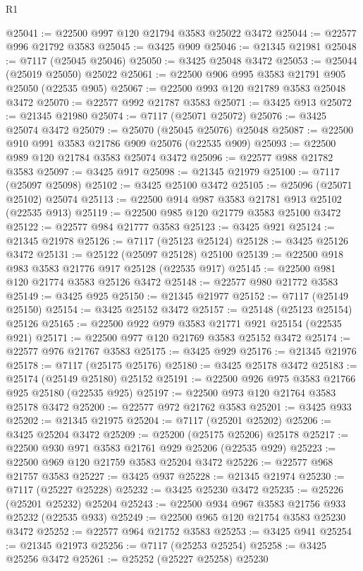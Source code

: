 \begin{lexlean}{R1}
\begin{coremodule}
@25041 := @22500 @997 @120 @21794 @3583 @25022 @3472
@25044 := @22577 @996 @21792 @3583
@25045 := @3425 @909
@25046 := @21345 @21981
@25048 := @7117 (@25045 @25046)
@25050 := @3425 @25048 @3472
@25053 := @25044 (@25019 @25050) @25022
@25061 := @22500 @906 @995 @3583 @21791 @905 @25050 (@22535 @905)
@25067 := @22500 @993 @120 @21789 @3583 @25048 @3472
@25070 := @22577 @992 @21787 @3583
@25071 := @3425 @913
@25072 := @21345 @21980
@25074 := @7117 (@25071 @25072)
@25076 := @3425 @25074 @3472
@25079 := @25070 (@25045 @25076) @25048
@25087 := @22500 @910 @991 @3583 @21786 @909 @25076 (@22535 @909)
@25093 := @22500 @989 @120 @21784 @3583 @25074 @3472
@25096 := @22577 @988 @21782 @3583
@25097 := @3425 @917
@25098 := @21345 @21979
@25100 := @7117 (@25097 @25098)
@25102 := @3425 @25100 @3472
@25105 := @25096 (@25071 @25102) @25074
@25113 := @22500 @914 @987 @3583 @21781 @913 @25102 (@22535 @913)
@25119 := @22500 @985 @120 @21779 @3583 @25100 @3472
@25122 := @22577 @984 @21777 @3583
@25123 := @3425 @921
@25124 := @21345 @21978
@25126 := @7117 (@25123 @25124)
@25128 := @3425 @25126 @3472
@25131 := @25122 (@25097 @25128) @25100
@25139 := @22500 @918 @983 @3583 @21776 @917 @25128 (@22535 @917)
@25145 := @22500 @981 @120 @21774 @3583 @25126 @3472
@25148 := @22577 @980 @21772 @3583
@25149 := @3425 @925
@25150 := @21345 @21977
@25152 := @7117 (@25149 @25150)
@25154 := @3425 @25152 @3472
@25157 := @25148 (@25123 @25154) @25126
@25165 := @22500 @922 @979 @3583 @21771 @921 @25154 (@22535 @921)
@25171 := @22500 @977 @120 @21769 @3583 @25152 @3472
@25174 := @22577 @976 @21767 @3583
@25175 := @3425 @929
@25176 := @21345 @21976
@25178 := @7117 (@25175 @25176)
@25180 := @3425 @25178 @3472
@25183 := @25174 (@25149 @25180) @25152
@25191 := @22500 @926 @975 @3583 @21766 @925 @25180 (@22535 @925)
@25197 := @22500 @973 @120 @21764 @3583 @25178 @3472
@25200 := @22577 @972 @21762 @3583
@25201 := @3425 @933
@25202 := @21345 @21975
@25204 := @7117 (@25201 @25202)
@25206 := @3425 @25204 @3472
@25209 := @25200 (@25175 @25206) @25178
@25217 := @22500 @930 @971 @3583 @21761 @929 @25206 (@22535 @929)
@25223 := @22500 @969 @120 @21759 @3583 @25204 @3472
@25226 := @22577 @968 @21757 @3583
@25227 := @3425 @937
@25228 := @21345 @21974
@25230 := @7117 (@25227 @25228)
@25232 := @3425 @25230 @3472
@25235 := @25226 (@25201 @25232) @25204
@25243 := @22500 @934 @967 @3583 @21756 @933 @25232 (@22535 @933)
@25249 := @22500 @965 @120 @21754 @3583 @25230 @3472
@25252 := @22577 @964 @21752 @3583
@25253 := @3425 @941
@25254 := @21345 @21973
@25256 := @7117 (@25253 @25254)
@25258 := @3425 @25256 @3472
@25261 := @25252 (@25227 @25258) @25230

\end{coremodule}
\end{lexlean}

